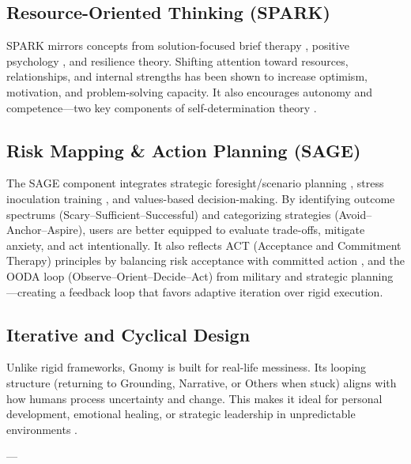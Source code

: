 \documentclass{article}
\begin{document}
\subsection{Resource-Oriented Thinking (SPARK)}
SPARK mirrors concepts from solution-focused brief therapy \cite{de1997building}, positive psychology \cite{seligman2011flourish}, and resilience theory. Shifting attention toward resources, relationships, and internal strengths has been shown to increase optimism, motivation, and problem-solving capacity. It also encourages autonomy and competence—two key components of self-determination theory \cite{ryan2000self}.

\subsection{Risk Mapping \& Action Planning (SAGE)}
The SAGE component integrates strategic foresight/scenario planning \cite{schoemaker1995scenario}, stress inoculation training \cite{meichenbaum1985stress}, and values-based decision-making. By identifying outcome spectrums (Scary–Sufficient–Successful) and categorizing strategies (Avoid–Anchor–Aspire), users are better equipped to evaluate trade-offs, mitigate anxiety, and act intentionally. It also reflects ACT (Acceptance and Commitment Therapy) principles by balancing risk acceptance with committed action \cite{hayes1999acceptance}, and the OODA loop (Observe–Orient–Decide–Act) from military and strategic planning \cite{boyd1986destruction}—creating a feedback loop that favors adaptive iteration over rigid execution.

\subsection{Iterative and Cyclical Design}
Unlike rigid frameworks, Gnomy is built for real-life messiness. Its looping structure (returning to Grounding, Narrative, or Others when stuck) aligns with how humans process uncertainty and change. This makes it ideal for personal development, emotional healing, or strategic leadership in unpredictable environments \cite{kolb1984experiential}.

---
\end{document}
